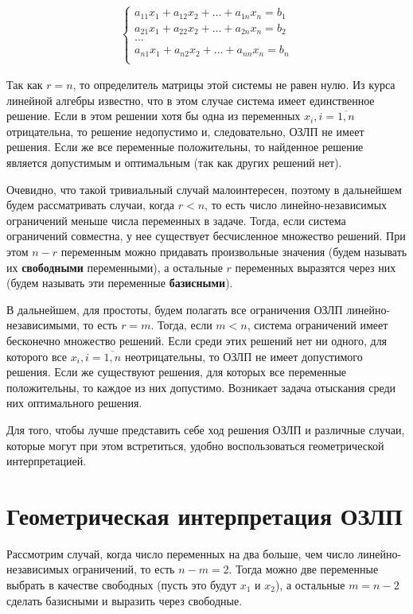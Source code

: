 \documentclass[a4paper,12pt]{report}
\begin{document}
\begin{align*}
\begin{cases}
a_{11}x_{1} + a_{12}x_{2} + \ldots + a_{1n}x_{n} = b_{1} \\
a_{21}x_{1} + a_{22}x_{2} + \ldots + a_{2n}x_{n} = b_{2} \\
\ldots \\
a_{n1}x_{1} + a_{n2}x_{2} + \ldots + a_{nn}x_{n} = b_{n} \\
\end{cases}	
\end{align*}

Так как $r = n$, то определитель матрицы этой системы не равен нулю. Из курса линейной алгебры известно, что в этом случае система имеет единственное решение. Если в этом решении хотя бы одна из переменных $x_{i}, i=\overline{1,n}$ отрицательна, то решение недопустимо и, следовательно, ОЗЛП не имеет решения. Если же все переменные положительны, то найденное решение является допустимым и оптимальным (так как других решений нет).

Очевидно, что такой тривиальный случай малоинтересен, поэтому в дальнейшем будем рассматривать случаи, когда $r < n$, то есть число линейно-независимых ограничений меньше числа переменных в задаче. Тогда, если система ограничений совместна, у нее существует бесчисленное множество решений. При этом $n-r$ переменным можно придавать произвольные значения (будем называть их \textbf{свободными} переменными), а остальные $r$ переменных выразятся через них (будем называть эти переменные \textbf{базисными}).

В дальнейшем, для простоты, будем полагать все ограничения ОЗЛП линейно-независимыми, то есть $r = m$. Тогда, если $m < n$, система ограничений имеет бесконечно множество решений. Если среди этих решений нет ни одного, для которого все $x_{i}, i=\overline{1,n}$ неотрицательны, то ОЗЛП не имеет допустимого решения. Если же существуют решения, для которых все переменные положительны, то каждое из них допустимо. Возникает задача отыскания среди них оптимального решения.

Для того, чтобы лучше представить себе ход решения ОЗЛП и различные случаи, которые могут при этом встретиться, удобно воспользоваться геометрической интерпретацией.

\section{Геометрическая интерпретация ОЗЛП}
\label{sec:LP_Geom}
Рассмотрим случай, когда число переменных на два больше, чем число линейно-независимых ограничений, то есть $n - m = 2$. Тогда можно две переменные выбрать в качестве свободных (пусть это будут $x_{1}$ и $x_{2}$), а остальные $m = n - 2$ сделать базисными и выразить через свободные.
\end{document}
